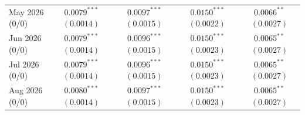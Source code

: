 \begin{tabular}{lcccc}
May 2026 (0/0) & $0.0079^{***}$ $(0.0014)$ & $0.0097^{***}$ $(0.0015)$ & $0.0150^{***}$ $(0.0022)$ & $0.0066^{**}$ $(0.0027)$ \\
Jun 2026 (0/0) & $0.0079^{***}$ $(0.0014)$ & $0.0096^{***}$ $(0.0015)$ & $0.0150^{***}$ $(0.0023)$ & $0.0065^{**}$ $(0.0027)$ \\
Jul 2026 (0/0) & $0.0079^{***}$ $(0.0014)$ & $0.0096^{***}$ $(0.0015)$ & $0.0150^{***}$ $(0.0023)$ & $0.0065^{**}$ $(0.0027)$ \\
Aug 2026 (0/0) & $0.0080^{***}$ $(0.0014)$ & $0.0097^{***}$ $(0.0015)$ & $0.0150^{***}$ $(0.0023)$ & $0.0065^{**}$ $(0.0027)$ \\
\bottomrule
\end{tabular}
